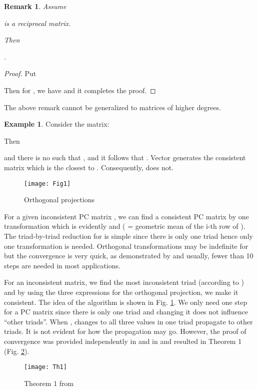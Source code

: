 \documentclass [12pt]{article}
\newtheorem{rem}{\bf Remark}
\theoremstyle{definition}
\newtheorem{ex}{\bf Example}
\begin{document}
\begin{rem}
Assume

is a reciprocal matrix.
\begin{flushleft} Then \end{flushleft} .
\end{rem}


\begin{proof}
Put 

Then for , we have  and it completes the proof.

\end{proof}

The above remark cannot be generalized to matrices of higher degrees.

\begin{ex}
Consider the matrix:


Then

and there is no  such that , and it follows that . Vector  generates the consistent matrix which is the closest to . Consequently,  does not.
\end{ex}


\begin{figure}[h]
\centering
\texttt{[image: Fig1]}
\caption[Orthogonal projections]{Orthogonal projections}
\label{fig:OrthogProj}
\end{figure}

For a given inconsistent PC matrix , we can find a consistent PC matrix by one transformation which is evidently   and  ( = geometric mean of the i-th row of ). The triad-by-triad reduction for  is simple since there is only one triad hence only one transformation is needed. Orthogonal transformations may be indefinite for  but the convergence is very quick, as demonstrated by \cite{KKSX2015} and usually, fewer than 10 steps are needed in most applications.

For an inconsistent matrix, we find the most inconsistent triad (according to ) and by using the three expressions for the orthogonal projection, we make it consistent. The idea of the algorithm is shown in Fig. \ref{fig:OrthogProj}. 
We only need one step for a PC matrix  since there is only one triad and changing it does not influence ``other triads''. When , changes  to all three values in one triad propagate to other triads. It is not evident for  how the propagation may go. However, the proof of convergence was provided independently in \cite{BB1996} and in \cite{KS2010} and resulted in Theorem 1 (Fig. \ref{fig:Th1}).

\begin{figure}[h]
\centering
\texttt{[image: Th1]}
\caption[Theorem 1]{Theorem 1 from \cite{KS2010}}
\label{fig:Th1}
\end{figure}
\end{document}
